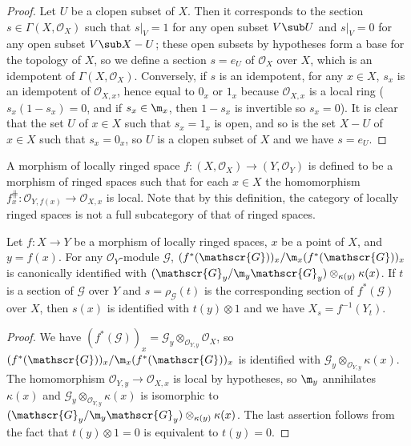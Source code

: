 \begin{proof}
Let $U$ be a clopen subset of $X$. Then it corresponds to the section $s\in\Gamma(X,\mathscr{O}_X)$ such that $s|_V=1$ for any open subset $V\sub U$ and $s|_V=0$ for any open subset $V\sub X-U$; these open subsets by hypotheses form a base for the topology of $X$, so we define a section $s=e_U$ of $\mathscr{O}_X$ over $X$, which is an idempotent of $\Gamma(X,\mathscr{O}_X)$. Conversely, if $s$ is an idempotent, for any $x\in X$, $s_x$ is an idempotent of $\mathscr{O}_{X,x}$, hence equal to $0_x$ or $1_x$ because $\mathscr{O}_{X,x}$ is a local ring ($s_x(1-s_x)=0$, and if $s_x\in\m_x$, then $1-s_x$ is invertible so $s_x=0$). It is clear that the set $U$ of $x\in X$ such that $s_x=1_x$ is open, and so is the set $X-U$ of $x\in X$ such that $s_x=0_x$, so $U$ is a clopen subset of $X$ and we have $s=e_U$. 
\end{proof}
A morphism of locally ringed space $f:(X,\mathscr{O}_X)\to(Y,\mathscr{O}_Y)$ is defined to be a morphism of ringed spaces such that for each $x\in X$ the homomorphism $f_{x}^{\hash}:\mathscr{O}_{Y,f(x)}\to\mathscr{O}_{X,x}$ is local. Note that by this definition, the category of locally ringed spaces is not a full subcategory of that of ringed spaces.
\begin{proposition}\label{ringed space local residue of pullback char}
Let $f:X\to Y$ be a morphism of locally ringed spaces, $x$ be a point of $X$, and $y=f(x)$. For any $\mathscr{O}_Y$-module $\mathscr{G}$, $(f^*(\mathscr{G}))_x/\m_x(f^*(\mathscr{G}))_x$ is canonically identified with $(\mathscr{G}_y/\m_y\mathscr{G}_y)\otimes_{\kappa(y)}\kappa(x)$. If $t$ is a section of $\mathscr{G}$ over $Y$ and $s=\rho_{\mathscr{G}}(t)$ is the corresponding section of $f^*(\mathscr{G})$ over $X$, then $s(x)$ is identified with $t(y)\otimes 1$ and we have $X_s=f^{-1}(Y_t)$.
\end{proposition}
\begin{proof}
We have $(f^*(\mathscr{G}))_x=\mathscr{G}_y\otimes_{\mathscr{O}_{Y,y}}\mathscr{O}_X$, so $(f^*(\mathscr{G}))_x/\m_x(f^*(\mathscr{G}))_x$ is identified with $\mathscr{G}_y\otimes_{\mathscr{O}_{Y,y}}\kappa(x)$. The homomorphism $\mathscr{O}_{Y,y}\to\mathscr{O}_{X,x}$ is local by hypotheses, so $\m_y$ annihilates $\kappa(x)$ and $\mathscr{G}_y\otimes_{\mathscr{O}_{Y,y}}\kappa(x)$ is isomorphic to $(\mathscr{G}_y/\m_y\mathscr{G}_y)\otimes_{\kappa(y)}\kappa(x)$. The last assertion follows from the fact that $t(y)\otimes 1=0$ is equivalent to $t(y)=0$.
\end{proof}
